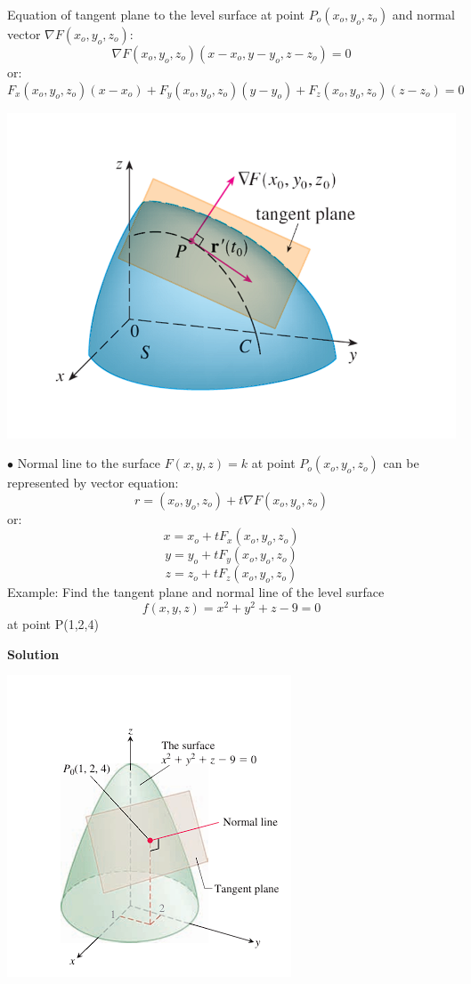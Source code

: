 \documentclass[12pt]{article}
\begin{document}
Equation of tangent plane to the level surface at point $P_o(x_o,y_o,z_o)$ and normal vector $\nabla F(x_o,y_o,z_o)$:
$$\nabla F(x_o,y_o,z_o)(x-x_o,y-y_o,z-z_o) = 0$$
or: 
$$F_x(x_o,y_o,z_o)(x-x_o)+F_y(x_o,y_o,z_o)(y-y_o)+F_z(x_o,y_o,z_o)(z-z_o) = 0$$
\begin{center}
    \includegraphics[scale  = 0.5]{9.png}
\end{center}

$\bullet$ Normal line to the surface $F(x,y,z) =k$ at point $P_o(x_o,y_o,z_o)$ can be represented by vector equation: 
$$r = (x_o,y_o,z_o)+ t\nabla F(x_o,y_o,z_o)$$
or:
$$x = x_o +tF_x(x_o,y_o,z_o)$$
$$y = y_o +tF_y(x_o,y_o,z_o)$$
$$z = z_o +tF_z(x_o,y_o,z_o)$$
Example: Find the tangent plane and normal line of the level surface 
$$f(x,y,z) = x^2 +y^2 +z - 9 = 0 $$
at point P(1,2,4)
 \begin{center}
     \textbf{Solution} 
 \end{center}
 \begin{center}
     \includegraphics[scale = 0.7]{10.png}
 \end{center}
\end{document}
